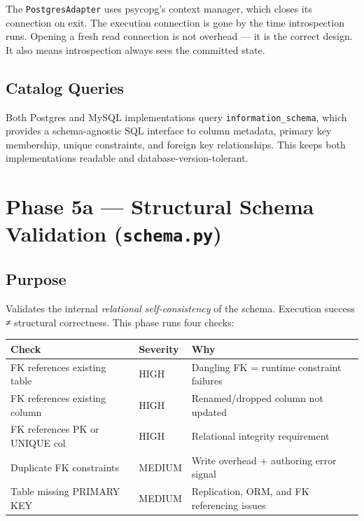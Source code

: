 \documentclass[12pt,a4paper]{report}
\begin{document}
The \texttt{PostgresAdapter} uses psycopg's context manager, which closes its
connection on exit. The execution connection is gone by the time introspection
runs. Opening a fresh read connection is not overhead — it is the correct design.
It also means introspection always sees the committed state.

\subsection{Catalog Queries}

Both Postgres and MySQL implementations query \texttt{information\_schema}, which
provides a schema-agnostic SQL interface to column metadata, primary key membership,
unique constraints, and foreign key relationships. This keeps both implementations
readable and database-version-tolerant.

\section{Phase 5a — Structural Schema Validation (\texttt{schema.py})}

\subsection{Purpose}

Validates the internal \emph{relational self-consistency} of the schema. Execution
success ≠ structural correctness. This phase runs four checks:

\begin{center}
\begin{tabular}{@{}p{5.5cm}ll@{}}
\toprule
\textbf{Check} & \textbf{Severity} & \textbf{Why} \\
\midrule
FK references existing table    & HIGH   & Dangling FK = runtime constraint failures \\
FK references existing column   & HIGH   & Renamed/dropped column not updated \\
FK references PK or UNIQUE col  & HIGH   & Relational integrity requirement \\
Duplicate FK constraints        & MEDIUM & Write overhead + authoring error signal \\
Table missing PRIMARY KEY       & MEDIUM & Replication, ORM, and FK referencing issues \\
\bottomrule
\end{tabular}
\end{center}
\end{document}
